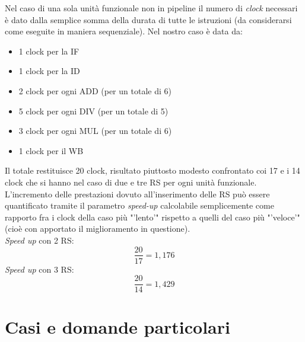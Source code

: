 Nel caso di una sola unità funzionale non in pipeline il numero di \textit{clock} necessari è dato dalla semplice somma della durata di tutte le istruzioni (da considerarsi come eseguite in maniera sequenziale). Nel nostro caso è data da: 
\begin{itemize}
\item 1 clock per la IF
\item 1 clock per la ID
\item 2 clock per ogni ADD (per un totale di 6)
\item 5 clock per ogni DIV (per un totale di 5)
\item 3 clock per ogni MUL (per un totale di 6)
\item 1 clock per il WB
\end{itemize}
Il totale restituisce 20 clock, risultato piuttosto modesto confrontato coi 17 e i 14 clock che si hanno nel caso di due e tre RS per ogni unità funzionale. L'incremento delle prestazioni dovuto all'inserimento delle RS può essere quantificato tramite il parametro \textit{speed-up} calcolabile semplicemente come rapporto fra i clock della caso più "'lento'" rispetto a quelli del caso più "'veloce'" (cioè con apportato il miglioramento in questione). \\
\textit{Speed up} con 2 RS: 
\[
\dfrac{20}{17}=1,176
\]
\textit{Speed up} con 3 RS:
\[
\dfrac{20}{14}=1,429
\]

\section{Casi e domande particolari}
\label{sec:casiParticolari}

